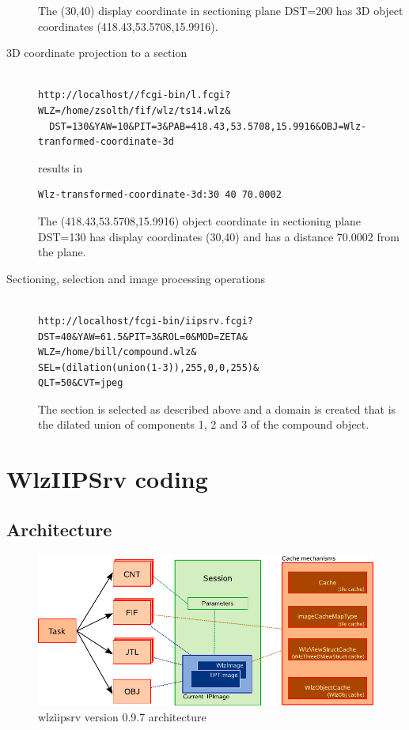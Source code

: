\documentclass[11pt]{article}
\begin{document}
\begin{description}
The (30,40) display coordinate in sectioning plane DST=200 has 3D object
coordinates (418.43,53.5708,15.9916).

\item[3D coordinate projection to a section]
\begin{verbatim}

http://localhost//fcgi-bin/l.fcgi?WLZ=/home/zsolth/fif/wlz/ts14.wlz&
  DST=130&YAW=10&PIT=3&PAB=418.43,53.5708,15.9916&OBJ=Wlz-tranformed-coordinate-3d
\end{verbatim}
results in
\begin{verbatim}
Wlz-transformed-coordinate-3d:30 40 70.0002
\end{verbatim}
The (418.43,53.5708,15.9916) object coordinate in sectioning plane DST=130
has display coordinates (30,40) and has a distance 70.0002 from the plane.

\item[Sectioning, selection and image processing operations]
\begin{verbatim}

http://localhost/fcgi-bin/iipsrv.fcgi?DST=40&YAW=61.5&PIT=3&ROL=0&MOD=ZETA&
WLZ=/home/bill/compound.wlz&
SEL=(dilation(union(1-3)),255,0,0,255)&
QLT=50&CVT=jpeg
\end{verbatim}

The section is selected as described above and a domain is created that is
the dilated union of components 1, 2 and 3 of the compound object.
\end{description}


\section{WlzIIPSrv coding}

\subsection{Architecture}
\begin{figure}[!htb]
\includegraphics[width=\linewidth]{architecture}
\caption{wlziipsrv version 0.9.7 architecture}
\label{fig:architecture}
\end{figure}
\end{document}
